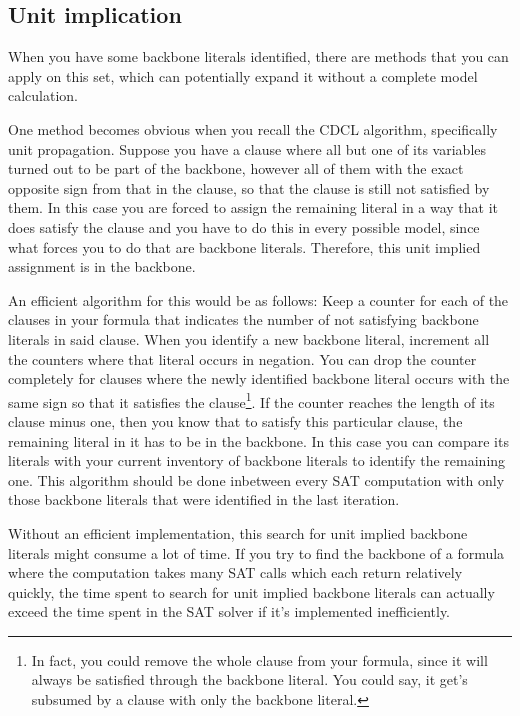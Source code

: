 \subsection{Unit implication}
\label{subsec:unitImpl}

When you have some backbone literals identified, there are methods that you can apply on this set, which can potentially expand it without a complete model calculation. 

One method becomes obvious when you recall the CDCL algorithm, specifically unit propagation. Suppose you have a clause where all but one of its variables turned out to be part of the backbone, however all of them with the exact opposite sign from that in the clause, so that the clause is still not satisfied by them. In this case you are forced to assign the remaining literal in a way that it does satisfy the clause and you have to do this in every possible model, since what forces you to do that are backbone literals. Therefore, this unit implied assignment is in the backbone.

An efficient algorithm for this would be as follows: Keep a counter for each of the clauses in your formula that indicates the number of not satisfying backbone literals in said clause. When you identify a new backbone literal, increment all the counters where that literal occurs in negation. You can drop the counter completely for clauses where the newly identified backbone literal occurs with the same sign so that it satisfies the clause\footnote{
	In fact, you could remove the whole clause from your formula, since it will always be satisfied through the backbone literal. You could say, it get's subsumed by a clause with only the backbone literal.}.
If the counter reaches the length of its clause minus one, then you know that to satisfy this particular clause, the remaining literal in it has to be in the backbone. In this case you can compare its literals with your current inventory of backbone literals to identify the remaining one. This algorithm should be done inbetween every SAT computation with only those backbone literals that were identified in the last iteration.


Without an efficient implementation, this search for unit implied backbone literals might consume a lot of time. If you try to find the backbone of a formula where the computation takes many SAT calls which each return relatively quickly, the time spent to search for unit implied backbone literals can actually exceed the time spent in the SAT solver if it's implemented inefficiently.

